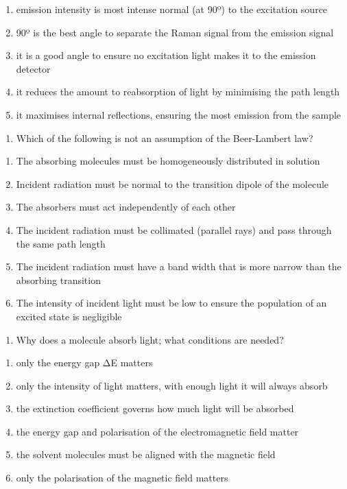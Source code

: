 \documentclass[
]{book}
\providecommand{\tightlist}{%
  \setlength{\itemsep}{0pt}\setlength{\parskip}{0pt}}
\begin{document}
\begin{enumerate}
\def\labelenumi{\alph{enumi}.}
\tightlist
\item
  emission intensity is most intense normal (at 90º) to the excitation source
\item
  90º is the best angle to separate the Raman signal from the emission signal
\item
  it is a good angle to ensure no excitation light makes it to the emission detector
\item
  it reduces the amount to reabsorption of light by minimising the path length
\item
  it maximises internal reflections, ensuring the most emission from the sample
\end{enumerate}

\begin{enumerate}
\def\labelenumi{\arabic{enumi}.}
\setcounter{enumi}{1}
\tightlist
\item
  Which of the following is not an assumption of the Beer-Lambert law?
\end{enumerate}

\begin{enumerate}
\def\labelenumi{\alph{enumi}.}
\tightlist
\item
  The absorbing molecules must be homogeneously distributed in solution
\item
  Incident radiation must be normal to the transition dipole of the molecule
\item
  The absorbers must act independently of each other
\item
  The incident radiation must be collimated (parallel rays) and pass through the same path length
\item
  The incident radiation must have a band width that is more narrow than the absorbing transition
\item
  The intensity of incident light must be low to ensure the population of an excited state is negligible
\end{enumerate}

\begin{enumerate}
\def\labelenumi{\arabic{enumi}.}
\setcounter{enumi}{2}
\tightlist
\item
  Why does a molecule absorb light; what conditions are needed?
\end{enumerate}

\begin{enumerate}
\def\labelenumi{\alph{enumi}.}
\tightlist
\item
  only the energy gap ΔE matters
\item
  only the intensity of light matters, with enough light it will always absorb
\item
  the extinction coefficient governs how much light will be absorbed
\item
  the energy gap and polarisation of the electromagnetic field matter
\item
  the solvent molecules must be aligned with the magnetic field
\item
  only the polarisation of the magnetic field matters
\end{enumerate}
\end{document}
